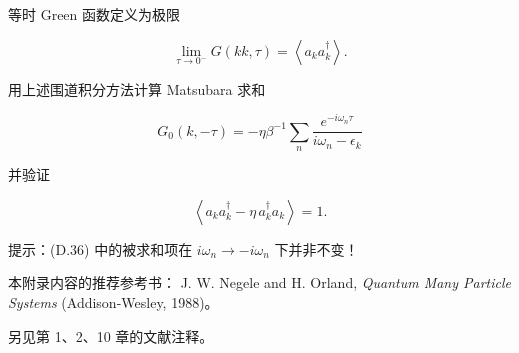 \begin{exercises}

\item 等时 Green 函数定义为极限

\begin{equation*}
\lim_{\tau \rightarrow 0 ^ {-}} G \left( kk, \tau \right) = \left\langle a _ {k} a _ {k} ^ {\dagger} \right\rangle .
\tag{D.35}
\end{equation*}

用上述围道积分方法计算 Matsubara 求和

\begin{equation*}
G _ {0} \left( k, - \tau \right) = - \eta \beta^ {- 1} \sum_ {n} \frac {e ^ {- i\omega_ {n} \tau}}{i\omega_ {n} - \epsilon_{k}}
\tag{D.36}
\end{equation*}

并验证

\begin{equation*}
\left\langle a _ {k} a _ {k} ^ {\dagger} - \eta \, a _ {k} ^ {\dagger} a _ {k} \right\rangle = 1.
\tag{D.37}
\end{equation*}

提示：(D.36) 中的被求和项在 $i\omega_{n} \rightarrow -i\omega_{n}$ 下并非不变！

\end{exercises}

\begin{chapbib}
\item 本附录内容的推荐参考书：
  J. W. Negele and H. Orland, \textit{Quantum Many Particle Systems} (Addison-Wesley, 1988)。
\item 另见第 1、2、10 章的文献注释。
\end{chapbib}
